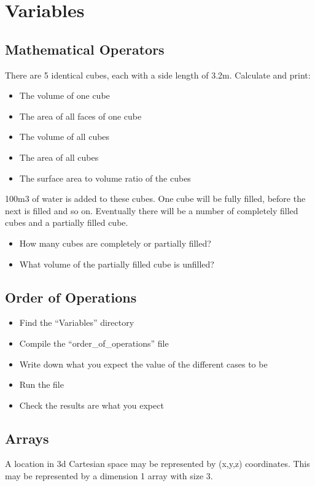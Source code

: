\documentclass[11pt,a4paper]{article}
\begin{document}
\section{Variables}

\subsection{Mathematical Operators}
There are 5 identical cubes, each with a side length of 3.2m. Calculate and print:

\begin{itemize}
    \item The volume of one cube
    \item The area of all faces of one cube
    \item The volume of all cubes
    \item The area of all cubes
    \item The surface area to volume ratio of the cubes
\end{itemize}

100m3 of water is added to these cubes. One cube will be fully filled, before the next is filled and so on. Eventually there will be a number of completely filled cubes and a partially filled cube.

\begin{itemize}
    \item How many cubes are completely or partially filled?
    \item What volume of the partially filled cube is unfilled?
\end{itemize}


\subsection{Order of Operations}
\begin{itemize}
    \item Find the “Variables” directory
    \item Compile the “order\_of\_operations” file
    \item Write down what you expect the value of the different cases to be
    \item Run the file
    \item Check the results are what you expect
\end{itemize}



\subsection{Arrays}
A location in 3d Cartesian space may be represented by (x,y,z) coordinates. This may be represented by a dimension 1 array with size 3.
\end{document}
